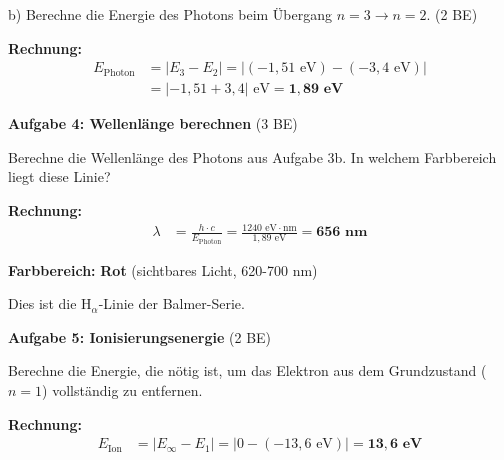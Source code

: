 \documentclass[11pt,a4paper]{article}
\begin{document}
\vspace{0.5em}

b) Berechne die Energie des Photons beim Übergang $n = 3 \to n = 2$. (2 BE)

\begin{tcolorbox}[loesungbox]
\textbf{Rechnung:}
\begin{align*}
E_{\text{Photon}} &= |E_3 - E_2| = |(-1{,}51 \text{ eV}) - (-3{,}4 \text{ eV})| \\[0.3em]
&= |-1{,}51 + 3{,}4| \text{ eV} = \mathbf{1{,}89 \text{ eV}}
\end{align*}
\end{tcolorbox}

\vspace{0.5em}


\textbf{Aufgabe 4: Wellenlänge berechnen} \hfill (3 BE)

\vspace{0.3em}

Berechne die Wellenlänge des Photons aus Aufgabe 3b. In welchem Farbbereich liegt diese Linie?

\begin{tcolorbox}[loesungbox]
\textbf{Rechnung:}
\begin{align*}
\lambda &= \frac{h \cdot c}{E_{\text{Photon}}} = \frac{1240 \text{ eV} \cdot \text{nm}}{1{,}89 \text{ eV}} = \mathbf{656 \text{ nm}}
\end{align*}

\textbf{Farbbereich:} \textbf{Rot} (sichtbares Licht, 620-700 nm)

Dies ist die H$_\alpha$-Linie der Balmer-Serie.
\end{tcolorbox}

\vspace{0.5em}


\textbf{Aufgabe 5: Ionisierungsenergie} \hfill (2 BE)

\vspace{0.3em}

Berechne die Energie, die nötig ist, um das Elektron aus dem Grundzustand ($n=1$) vollständig zu entfernen.

\begin{tcolorbox}[loesungbox]
\textbf{Rechnung:}
\begin{align*}
E_{\text{Ion}} &= |E_{\infty} - E_1| = |0 - (-13{,}6 \text{ eV})| = \mathbf{13{,}6 \text{ eV}}
\end{align*}
\end{tcolorbox}
\end{document}
